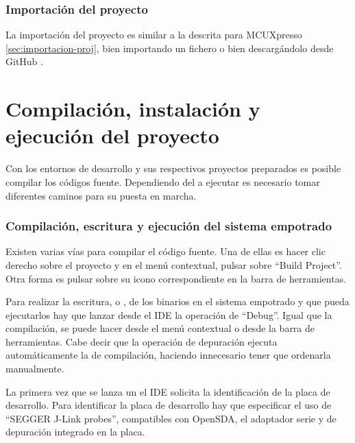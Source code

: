 \subsubsection{Importación del proyecto} \label{sec:importacion-proj-ee}
La importación del proyecto es similar a la descrita para MCUXpresso
\ref{sec:importacion-proj}, bien importando un fichero o bien descargándolo
desde GitHub \cite{webpage:repo-aw}.


\clearpage



\section{Compilación, instalación y ejecución del proyecto} \label{sec:exe}
Con los entornos de desarrollo y sus respectivos proyectos preparados es posible
compilar los códigos fuente. Dependiendo del  a ejecutar
es necesario tomar diferentes caminos para su puesta en marcha.


\subsubsection{Compilación, escritura y ejecución del sistema empotrado}
\label{sec:exe-se}
Existen varias vías para compilar el código fuente. Una de ellas es hacer clic
derecho sobre el proyecto y en el menú contextual, pulsar sobre ``Build
Project''. Otra forma es pulsar sobre su icono correspondiente en la barra de
herramientas.

Para realizar la escritura, o , de los binarios en el
sistema empotrado y que pueda ejecutarlos hay que lanzar desde el IDE la
operación de ``Debug''. Igual que la compilación, se puede hacer desde el menú
contextual o desde la barra de herramientas. Cabe decir que la operación de
depuración ejecuta automáticamente la de compilación, haciendo innecesario tener
que ordenarla manualmente.

La primera vez que se lanza un  el IDE solicita la
identificación de la placa de desarrollo. Para identificar la placa de
desarrollo hay que especificar el uso de ``SEGGER J-Link probes'', 
compatibles con OpenSDA, el adaptador serie y de depuración integrado en la
placa. 


